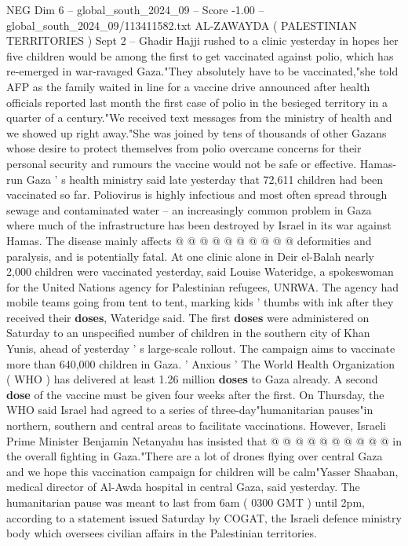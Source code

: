 \begin{textsample}{NEG Dim 6 – global\_south\_2024\_09 – Score -1.00 – global\_south\_2024\_09/113411582.txt}  \label{ex:f6_neg_013}
AL-ZAWAYDA ( PALESTINIAN TERRITORIES ) Sept 2 -- Ghadir Hajji rushed to a clinic yesterday in hopes her five children would be among the first to get vaccinated against polio, which has re-emerged in war-ravaged Gaza."They absolutely have to be vaccinated,"she told AFP as the family waited in line for a vaccine drive announced after health officials reported last month the first case of polio in the besieged territory in a quarter of a century."We received text messages from the ministry of health and we showed up right away."She was joined by tens of thousands of other Gazans whose desire to protect themselves from polio overcame concerns for their personal security and rumours the vaccine would not be safe or effective.
Hamas-run Gaza ' s health ministry said late yesterday that 72,611 children had been vaccinated so far.
Poliovirus is highly infectious and most often spread through sewage and contaminated water -- an increasingly common problem in Gaza where much of the infrastructure has been destroyed by Israel in its war against Hamas.
The disease mainly affects @ @ @ @ @ @ @ @ @ @ deformities and paralysis, and is potentially fatal.
At one clinic alone in Deir el-Balah nearly 2,000 children were vaccinated yesterday, said Louise Wateridge, a spokeswoman for the United Nations agency for Palestinian refugees, UNRWA.
The agency had mobile teams going from tent to tent, marking kids ' thumbs with ink after they received their \textbf{doses}, Wateridge said.
The first \textbf{doses} were administered on Saturday to an unspecified number of children in the southern city of Khan Yunis, ahead of yesterday ' s large-scale rollout.
The campaign aims to vaccinate more than 640,000 children in Gaza. ' Anxious ' The World Health Organization ( WHO ) has delivered at least 1.26 million \textbf{doses} to Gaza already.
A second \textbf{dose} of the vaccine must be given four weeks after the first.
On Thursday, the WHO said Israel had agreed to a series of three-day"humanitarian pauses"in northern, southern and central areas to facilitate vaccinations.
However, Israeli Prime Minister Benjamin Netanyahu has insisted that @ @ @ @ @ @ @ @ @ @ in the overall fighting in Gaza."There are a lot of drones flying over central Gaza and we hope this vaccination campaign for children will be calm"Yasser Shaaban, medical director of Al-Awda hospital in central Gaza, said yesterday.
The humanitarian pause was meant to last from 6am ( 0300 GMT ) until 2pm, according to a statement issued Saturday by COGAT, the Israeli defence ministry body which oversees civilian affairs in the Palestinian territories.

\end{textsample}
